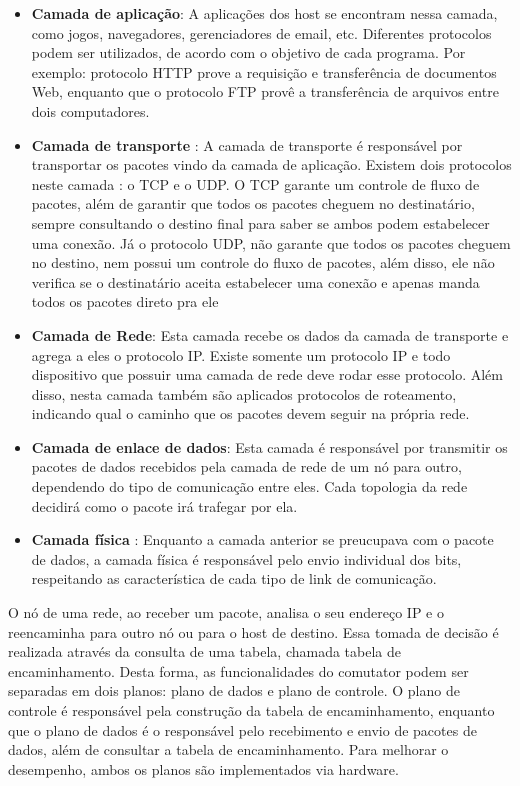 \begin{itemize}
\item \textbf{Camada de aplicação}: A aplicações dos host se encontram nessa camada, como jogos, navegadores, gerenciadores de email, etc. Diferentes protocolos podem ser utilizados, de acordo com o objetivo de cada programa. Por exemplo: protocolo HTTP prove a requisição e transferência de documentos Web, enquanto que o protocolo FTP provê a transferência de arquivos entre dois computadores.
\item \textbf{Camada de transporte} :  A camada de transporte é responsável por transportar os pacotes vindo da camada de aplicação. Existem dois protocolos neste camada : o TCP e o UDP. O TCP garante um controle de fluxo de pacotes, além de garantir que todos os pacotes cheguem no destinatário, sempre consultando o destino final para saber se ambos podem estabelecer uma conexão. Já o protocolo UDP, não garante que todos os pacotes cheguem no destino, nem possui um controle do fluxo de pacotes, além disso, ele não verifica se o destinatário aceita estabelecer uma conexão e apenas manda todos os pacotes direto pra ele
\item \textbf{Camada de Rede}: Esta camada recebe os dados da camada de transporte e agrega a eles o protocolo IP. Existe somente um protocolo IP e todo dispositivo que possuir uma camada de rede deve rodar esse protocolo. Além disso, nesta camada também são aplicados protocolos de roteamento, indicando qual o caminho que os pacotes devem seguir na própria rede.
\item \textbf{Camada de enlace de dados}: Esta camada é responsável por transmitir os pacotes de dados recebidos pela camada de rede de um nó para outro, dependendo do tipo de comunicação entre eles. Cada topologia da rede decidirá como o pacote irá trafegar por ela.
\item \textbf{Camada física} : Enquanto a camada anterior se preucupava com o pacote de dados, a camada física é responsável pelo envio individual dos bits, respeitando as característica de cada tipo de link de comunicação.
\end{itemize}

O nó de uma rede, ao receber um pacote, analisa o seu endereço IP e o reencaminha para outro nó ou para o host de destino. Essa tomada de decisão é realizada através da consulta de uma tabela, chamada tabela de encaminhamento. Desta forma, as funcionalidades do comutator podem ser separadas em dois planos: plano de dados e plano de controle. O plano de controle é responsável pela construção da tabela de encaminhamento, enquanto que o plano de dados é o responsável pelo recebimento e envio de pacotes de dados, além de consultar a tabela de encaminhamento. Para melhorar o desempenho, ambos os planos são implementados via hardware.

